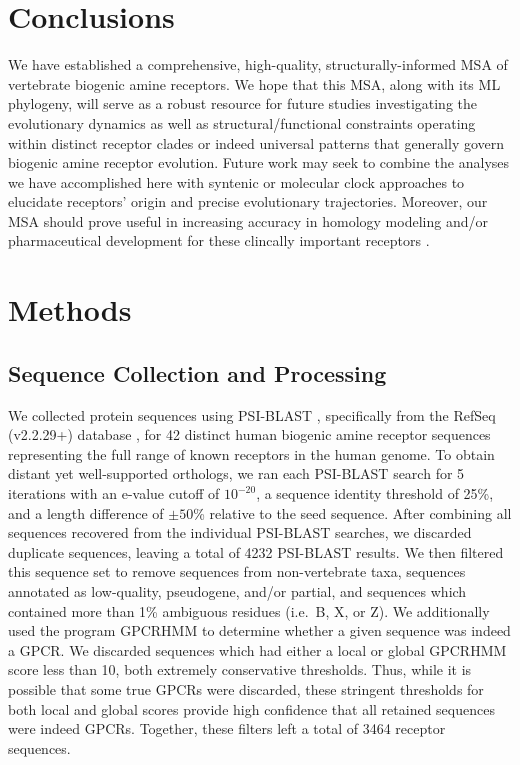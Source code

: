 \documentclass[fleqn,10pt]{wlpeerj}
\begin{document}
\section*{Conclusions}

We have established a comprehensive, high-quality, structurally-informed MSA of vertebrate biogenic amine receptors. We hope that this MSA, along with its ML phylogeny, will serve as a robust resource for future studies investigating the evolutionary dynamics as well as structural/functional constraints operating within distinct receptor clades or indeed universal patterns that generally govern biogenic amine receptor evolution. Future work may seek to combine the analyses we have accomplished here with syntenic or molecular clock approaches to elucidate receptors' origin and precise evolutionary trajectories. Moreover, our MSA should prove useful in increasing accuracy in homology modeling and/or pharmaceutical development for these clincally important receptors \citep{Kristiansen2004,Ishiguro2004,Eversetal2005,Masonetal2012}.




\section*{Methods}

\subsection*{Sequence Collection and Processing}
We collected protein sequences using PSI-BLAST \citep{psiblast}, specifically from the RefSeq (v2.2.29+) database \citep{refseq}, for 42 distinct human biogenic amine receptor sequences representing the full range of known receptors in the human genome. To obtain distant yet well-supported orthologs, we ran each PSI-BLAST search for 5 iterations with an e-value cutoff of $10^{-20}$, a sequence identity threshold of 25\%, and a length difference of $\pm50$\% relative to the seed sequence. After combining all sequences recovered from the individual PSI-BLAST searches, we discarded duplicate sequences, leaving a total of 4232 PSI-BLAST results. We then filtered this sequence set to remove sequences from non-vertebrate taxa, sequences annotated as low-quality, pseudogene, and/or partial, and sequences which contained more than 1\% ambiguous residues (i.e.\ B, X, or Z). We additionally used the program GPCRHMM \citep{Wistrand2006} to determine whether a given sequence was indeed a GPCR. We discarded sequences which had either a local or global GPCRHMM score less than 10, both extremely conservative thresholds. Thus, while it is possible that some true GPCRs were discarded, these stringent thresholds for both local and global scores provide high confidence that all retained sequences were indeed GPCRs. Together, these filters left a total of 3464 receptor sequences.
\end{document}
